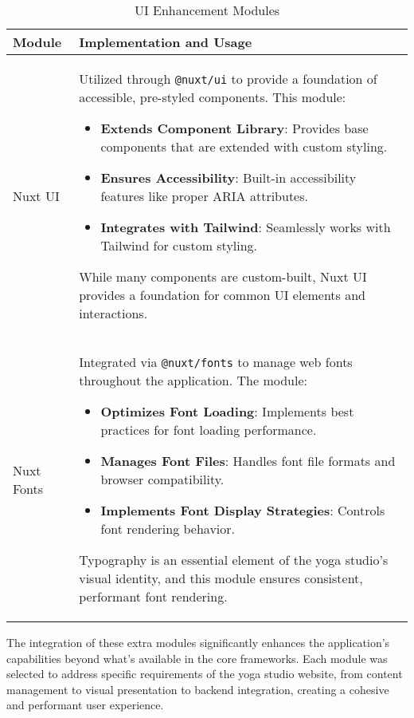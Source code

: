 \begin{table}[H]
    \centering
    \setlength{\tabcolsep}{5pt}
    \renewcommand{\arraystretch}{1.2} 
    \begin{tabular}{|p{3.5cm}|p{10.8cm}|}
        \hline
        \rowcolor{bluepoli!20}
        \textbf{Module} & \textbf{Implementation and Usage} \\
        \hline
        Nuxt UI & 
        Utilized through \texttt{@nuxt/ui} to provide a foundation of accessible, pre-styled components. This module:
        \begin{itemize}
            \item \textbf{Extends Component Library}: Provides base components that are extended with custom styling.
            \item \textbf{Ensures Accessibility}: Built-in accessibility features like proper ARIA attributes.
            \item \textbf{Integrates with Tailwind}: Seamlessly works with Tailwind for custom styling.
        \end{itemize}
        While many components are custom-built, Nuxt UI provides a foundation for common UI elements and interactions.
        \\
        \hline
        Nuxt Fonts & 
        Integrated via \texttt{@nuxt/fonts} to manage web fonts throughout the application. The module:
        \begin{itemize}
            \item \textbf{Optimizes Font Loading}: Implements best practices for font loading performance.
            \item \textbf{Manages Font Files}: Handles font file formats and browser compatibility.
            \item \textbf{Implements Font Display Strategies}: Controls font rendering behavior.
        \end{itemize}
        Typography is an essential element of the yoga studio's visual identity, and this module ensures consistent, performant font rendering.
        \\
        \hline
    \end{tabular}
    \caption{UI Enhancement Modules}
\end{table}

The integration of these extra modules significantly enhances the application's capabilities beyond what's available in the core frameworks. Each module was selected to address specific requirements of the yoga studio website, from content management to visual presentation to backend integration, creating a cohesive and performant user experience.


